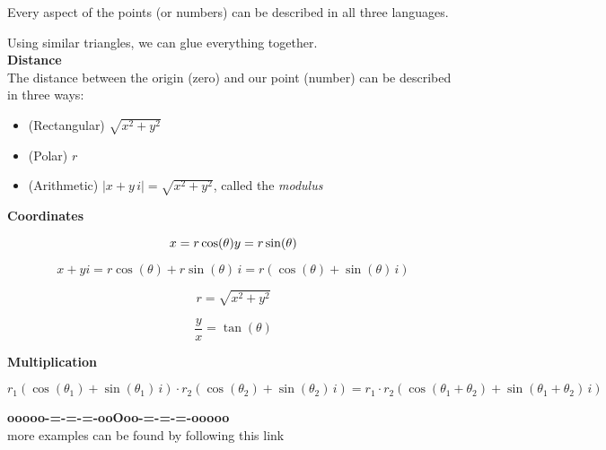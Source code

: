 \documentclass{ximera}
\begin{document}
Every aspect of the points (or numbers) can be described in all three languages.  


\qquad



Using similar triangles, we can glue everything together.  \\




\textbf{\textcolor{blue!55!black}{Distance}}  \\


The distance between the origin (zero) and our point (number) can be described in three ways:


\begin{itemize}
\item (Rectangular)  $\sqrt{x^2 + y^2}$
\item (Polar) $r$
\item (Arithmetic) $| x + y \, i  | = \sqrt{x^2 + y^2}$, called the \textit{modulus}
\end{itemize}



\qquad


\textbf{\textcolor{blue!55!black}{Coordinates}} 


\[
x = r \cos(\theta)  \\
y = r \sin(\theta)
\]


\[
x + y i = r \cos(\theta) + r \sin(\theta) \, i = r (\cos(\theta) +  \sin(\theta) \, i)
\]




\[
r = \sqrt{x^2 + y^2}
\]


\[
\frac{y}{x} = \tan(\theta)
\]





\qquad


\textbf{\textcolor{blue!55!black}{Multiplication}} 


\[
r_1 (\cos(\theta_1) +  \sin(\theta_1) \, i) \cdot r_2 (\cos(\theta_2) +  \sin(\theta_2) \, i) = r_1 \cdot r_2 (\cos(\theta_1 + \theta_2) +  \sin(\theta_1 + \theta_2) \, i) 
\]












\begin{center}
\textbf{\textcolor{green!50!black}{ooooo-=-=-=-ooOoo-=-=-=-ooooo}} \\

more examples can be found by following this link\\ 

\end{center}
\end{document}

